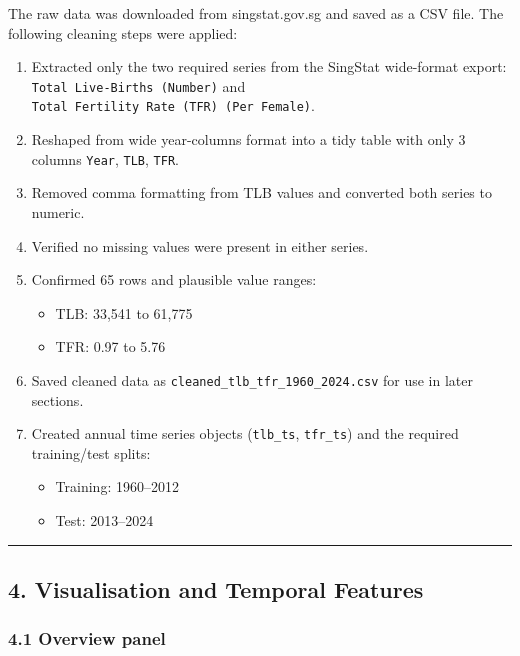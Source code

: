 \documentclass[
]{article}
\providecommand{\tightlist}{%
  \setlength{\itemsep}{0pt}\setlength{\parskip}{0pt}}
\begin{document}
The raw data was downloaded from singstat.gov.sg and saved as a CSV
file. The following cleaning steps were applied:

\begin{enumerate}
\def\labelenumi{\arabic{enumi}.}
\tightlist
\item
  Extracted only the two required series from the SingStat wide-format
  export: \texttt{Total\ Live-Births\ (Number)} and
  \texttt{Total\ Fertility\ Rate\ (TFR)\ (Per\ Female)}.
\item
  Reshaped from wide year-columns format into a tidy table with only 3
  columns \texttt{Year}, \texttt{TLB}, \texttt{TFR}.
\item
  Removed comma formatting from TLB values and converted both series to
  numeric.
\item
  Verified no missing values were present in either series.
\item
  Confirmed 65 rows and plausible value ranges:

  \begin{itemize}
  \tightlist
  \item
    TLB: 33,541 to 61,775
  \item
    TFR: 0.97 to 5.76
  \end{itemize}
\item
  Saved cleaned data as \texttt{cleaned\_tlb\_tfr\_1960\_2024.csv} for
  use in later sections.
\item
  Created annual time series objects (\texttt{tlb\_ts},
  \texttt{tfr\_ts}) and the required training/test splits:

  \begin{itemize}
  \tightlist
  \item
    Training: 1960--2012
  \item
    Test: 2013--2024
  \end{itemize}
\end{enumerate}

\begin{center}\rule{0.5\linewidth}{0.5pt}\end{center}

\subsection{4. Visualisation and Temporal
Features}\label{visualisation-and-temporal-features}

\subsubsection{4.1 Overview panel}\label{overview-panel}
\end{document}
